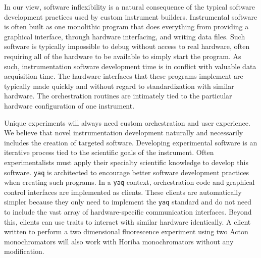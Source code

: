 \documentclass[aip, amsmath, amssymb, reprint,]{revtex4-2}
\newcommand\yaq{\texttt{yaq}}
\begin{document}
In our view, software inflexibility is a natural consequence of the typical software development practices used by custom instrument builders.
Instrumental software is often built as one monolithic program that does everything from providing a graphical interface, through hardware interfacing, and writing data files.
Such software is typically impossible to debug without access to real hardware, often requiring all of the hardware to be available to simply start the program.
As such, instrumentation software development time is in conflict with valuable data acquisition time.
The hardware interfaces that these programs implement are typically made quickly and without regard to standardization with similar hardware.
The orchestration routines are intimately tied to the particular hardware configuration of one instrument.

Unique experiments will always need custom orchestration and user experience.
We believe that novel instrumentation development naturally and necessarily includes the creation of targeted software.
Developing experimental software is an iterative process tied to the scientific goals of the instrument.
Often experimentalists must apply their specialty scientific knowledge to develop this software.\cite{SegalJudith2005a} %
\yaq{} is architected to encourage better software development practices when creating such programs.
In a \yaq{} context, orchestration code and graphical control interfaces are implemented as clients.
These clients are automatically simpler because they only need to implement the \yaq{} standard and do not need to include the vast array of hardware-specific communication interfaces.
Beyond this, clients can use traits to interact with similar hardware identically.
A client written to perform a two dimensional fluorescence experiment using two Acton monochromators will also work with Horiba monochromators without any modification.
\end{document}
